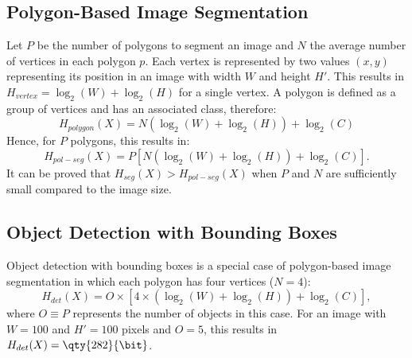 \subsection{Polygon-Based Image Segmentation}
Let $P$ be the number of polygons to segment an image and $N$ the average number of vertices in each polygon $p$. Each vertex is represented by two values $(x, y)$ representing its position in an image with width $W$ and height $H'$. This results in $H_{vertex}=\log_2(W) + \log_2(H)$\unit{\bit} for a single vertex. A polygon is defined as a group of vertices and has an associated class, therefore:
\begin{equation*}
    H_{polygon}(X) = N(\log_2(W) + \log_2(H)) + \log_2(C)
\end{equation*}
Hence, for $P$ polygons, this results in:
\begin{equation}
    H_{pol-seg}(X) = P[N(\log_2(W) + \log_2(H)) + \log_2(C)].
    \label{eq:polyseg_entropy}
\end{equation}
It can be proved that $H_{seg}(X) > H_{pol-seg}(X)$ when $P$ and $N$ are sufficiently small compared to the image size.

\subsection{Object Detection with Bounding Boxes}
Object detection with bounding boxes is a special case of polygon-based image segmentation in which each polygon has four vertices ($N=4$):
\begin{equation}
    H_{det}(X) = O\times [4\times(\log_2(W) + \log_2(H)) + \log_2(C)],
    \label{eq:bbox_entropy}
\end{equation}
where $O\equiv P$ represents the number of objects in this case. For an image with $W=100$ and $H'=100$ pixels and $O=5$, this results in $H_{det}(X)=\qty{282}{\bit}$.